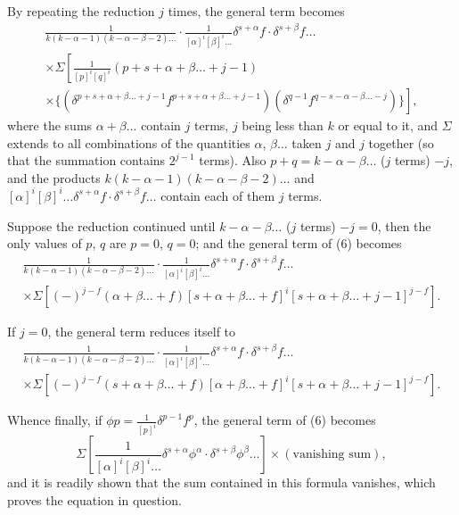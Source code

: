 \documentclass[11pt,a4paper]{book}
\begin{document}
By repeating the reduction $j$ times, the general term becomes
\begin{multline*}
\frac{1}{k(k-\alpha-1)(k-\alpha-\beta-2)\ldots} \cdot \frac{1}{[\alpha]^i [\beta]^i \ldots} \delta^{s+\alpha} f \cdot \delta^{s+\beta} f \ldots \\
\times \Sigma \left[ \frac{1}{[p]^i [q]^i} (p+s+\alpha+\beta\ldots+j-1) \right. \\
\left. \times \{ (\delta^{p+s+\alpha+\beta\ldots+j-1} f^{p+s+\alpha+\beta\ldots+j-1})(\delta^{q-1} f^{q-s-\alpha-\beta\ldots-j}) \} \right],
\end{multline*}
where the sums $\alpha + \beta \ldots$ contain $j$ terms, $j$ being less than $k$ or equal to it, and $\Sigma$ extends to all combinations of the quantities $\alpha$, $\beta \ldots$ taken $j$ and $j$ together (so that the summation contains $2^{j-1}$ terms). Also $p + q = k - \alpha - \beta \ldots$ ($j$ terms) $- j$, and the products $k(k-\alpha-1)(k-\alpha-\beta-2)\ldots$ and $[\alpha]^i [\beta]^i \ldots \delta^{s+\alpha} f \cdot \delta^{s+\beta} f \ldots$ contain each of them $j$ terms.

Suppose the reduction continued until $k - \alpha - \beta \ldots$ ($j$ terms) $- j = 0$, then the only values of $p$, $q$ are $p=0$, $q=0$; and the general term of (6) becomes
\begin{multline*}
\frac{1}{k(k-\alpha-1)(k-\alpha-\beta-2)\ldots} \cdot \frac{1}{[\alpha]^i [\beta]^i \ldots} \delta^{s+\alpha} f \cdot \delta^{s+\beta} f \ldots \\
\times \Sigma \left[ (-)^{j-f} (\alpha + \beta \ldots + f) [s + \alpha + \beta \ldots + f]^i [s + \alpha + \beta \ldots + j - 1]^{j-f} \right].
\end{multline*}

If $j=0$, the general term reduces itself to
\begin{multline*}
\frac{1}{k(k-\alpha-1)(k-\alpha-\beta-2)\ldots} \cdot \frac{1}{[\alpha]^i [\beta]^i \ldots} \delta^{s+\alpha} f \cdot \delta^{s+\beta} f \ldots \\
\times \Sigma \left[ (-)^{j-f} (s + \alpha + \beta \ldots + f) [\alpha + \beta \ldots + f]^i [s + \alpha + \beta \ldots + j - 1]^{j-f} \right].
\end{multline*}

Whence finally, if $\phi p = \frac{1}{[p]^i} \delta^{p-1} f^p$, the general term of (6) becomes
\[ \Sigma \left[ \frac{1}{[\alpha]^i [\beta]^i \ldots} \delta^{s+\alpha} \phi^{\alpha} \cdot \delta^{s+\beta} \phi^{\beta} \ldots \right] \times (\text{vanishing sum}), \]
and it is readily shown that the sum contained in this formula vanishes, which proves the equation in question.
\end{document}
